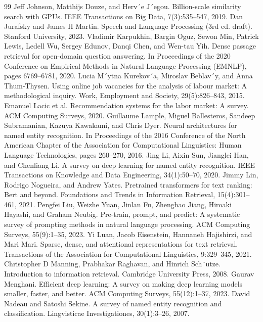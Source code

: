 \begin{thebibliography}{99}
 Jeff Johnson, Matthijs Douze, and Herv´e J´egou. Billion-scale similarity search with GPUs. IEEE Transactions on Big Data, 7(3):535--547, 2019.
 Dan Jurafsky and James H Martin. Speech and Language Processing (3rd ed. draft). Stanford University, 2023.
 Vladimir Karpukhin, Bargin Oguz, Sewon Min, Patrick Lewis, Ledell Wu, Sergey Edunov, Danqi Chen, and Wen-tau Yih. Dense passage retrieval for open-domain question answering. In Proceedings of the 2020 Conference on Empirical Methods in Natural Language Processing (EMNLP), pages 6769--6781, 2020.
 Lucia M´ytna Kurekov´a, Miroslav Beblav´y, and Anna Thum-Thysen. Using online job vacancies for the analysis of labour market: A methodological inquiry. Work, Employment and Society, 29(5):826--843, 2015.
 Emanuel Lacic et al. Recommendation systems for the labor market: A survey. ACM Computing Surveys, 2020.
 Guillaume Lample, Miguel Ballesteros, Sandeep Subramanian, Kazuya Kawakami, and Chris Dyer. Neural architectures for named entity recognition. In Proceedings of the 2016 Conference of the North American Chapter of the Association for Computational Linguistics: Human Language Technologies, pages 260--270, 2016.
 Jing Li, Aixin Sun, Jianglei Han, and Chenliang Li. A survey on deep learning for named entity recognition. IEEE Transactions on Knowledge and Data Engineering, 34(1):50--70, 2020.
 Jimmy Lin, Rodrigo Nogueira, and Andrew Yates. Pretrained transformers for text ranking: Bert and beyond. Foundations and Trends in Information Retrieval, 15(4):301--461, 2021.
 Pengfei Liu, Weizhe Yuan, Jinlan Fu, Zhengbao Jiang, Hiroaki Hayashi, and Graham Neubig. Pre-train, prompt, and predict: A systematic survey of prompting methods in natural language processing. ACM Computing Surveys, 55(9):1--35, 2023.
 Yi Luan, Jacob Eisenstein, Hannaneh Hajishirzi, and Mari Mari. Sparse, dense, and attentional representations for text retrieval. Transactions of the Association for Computational Linguistics, 9:329--345, 2021.
 Christopher D Manning, Prabhakar Raghavan, and Hinrich Sch¨utze. Introduction to information retrieval. Cambridge University Press, 2008.
 Gaurav Menghani. Efficient deep learning: A survey on making deep learning models smaller, faster, and better. ACM Computing Surveys, 55(12):1--37, 2023.
 David Nadeau and Satoshi Sekine. A survey of named entity recognition and classification. Lingvisticae Investigationes, 30(1):3--26, 2007.

\end{thebibliography}
